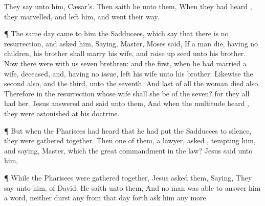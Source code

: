 {They
say unto
him,
Cæsar’s.
Then saith
he unto
them,
{}
When they had
heard
{}, they
marvelled,
and
left
him, and went their
way.
\par }{\PP {}¶
The
same
day
came to
him the
Sadducees, which say
that there
is
no
resurrection,
and
asked
him,
Saying,
Master,
Moses
said,
If a
man
die,
having
no
children,
his
brother shall
marry
his
wife,
and raise
up
seed
unto
his
brother.
Now there
were
with
us
seven
brethren:
and the
first, when he had married a
wife,
deceased,
and,
having
no
issue,
left
his
wife
unto
his
brother:
Likewise the
second
also,
and the
third,
unto the
seventh.
And
last of
all the
woman
died
also.
Therefore
in the
resurrection
whose
wife shall she
be of the
seven?
for
they
all
had
her.
Jesus
answered and
said unto
them,
{}
And
when the
multitude
heard
{}, they were
astonished
at
his
doctrine.
\par }{\PP {}¶
But
when the
Pharisees had
heard
that he had
put the
Sadducees to
silence, they were
gathered
together.
Then
one
of
them,
{} a
lawyer,
asked
{},
tempting
him,
and
saying,
Master,
which
{}
the
great
commandment
in the
law?
Jesus
said unto
him,
{}
\par }{\PP {}¶
While the
Pharisees were gathered
together,
Jesus
asked
them,
Saying,
{} They
say unto
him,
{} of
David.
He
saith unto
them,
{}
And no
man was
able to
answer
him a
word,
neither
durst
any
{}
from
that
day
forth
ask
him any
more
{}

}
